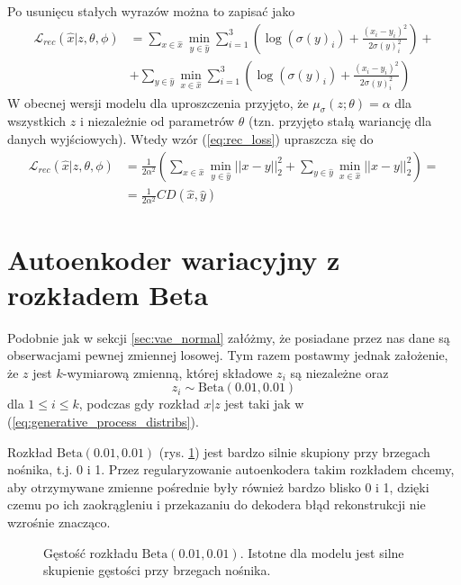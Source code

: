 \documentclass{iithesis}
\begin{document}
Po usunięcu stałych wyrazów można to zapisać jako
\begin{equation} \label{eq:rec_loss}
\begin{split}
\mathcal{L}_{rec}(\hat{x}|z,\theta,\phi) &= \sum_{x \in \hat{x}} \min_{y \in \hat{y}} \sum_{i=1}^3
\left( \log(\sigma(y)_i) + \frac{(x_i-y_i)^2}{2\sigma(y)_i^2} \right) +\\
&+ \sum_{y \in \hat{y}} \min_{x \in \hat{x}} \sum_{i=1}^3
\left( \log(\sigma(y)_i) + \frac{(x_i-y_i)^2}{2\sigma(y)_i^2} \right)
\end{split}
\end{equation}
W obecnej wersji modelu dla uproszczenia przyjęto, że $\mu_\sigma(z;\theta) = \alpha$
dla wszystkich $z$ i niezależnie od parametrów $\theta$ (tzn. przyjęto stałą wariancję dla
danych wyjściowych). Wtedy wzór (\ref{eq:rec_loss}) upraszcza się do
\begin{equation} \label{eq:final_rec_loss}
\begin{split}
\mathcal{L}_{rec}(\hat{x}|z,\theta,\phi) &= \frac{1}{2\alpha^2} \left(
\sum_{x \in \hat{x}} \min_{y \in \hat{y}} ||x-y||_2^2 +
\sum_{y \in \hat{y}} \min_{x \in \hat{x}} ||x-y||_2^2 \right) = \\
&= \frac{1}{2\alpha^2} CD(\hat{x}, \hat{y})
\end{split}
\end{equation}

\section{Autoenkoder wariacyjny z rozkładem Beta} \label{sec:vae_beta}
Podobnie jak w sekcji \ref{sec:vae_normal} załóżmy, że posiadane przez nas dane
są obserwacjami pewnej zmiennej losowej. Tym razem postawmy jednak założenie, że
$z$ jest $k$-wymiarową zmienną, której składowe $z_i$ są niezależne oraz
$$
z_i \sim \text{Beta}(0.01, 0.01)
$$
dla $1 \leq i \leq k$, podczas gdy rozkład $x|z$ jest taki jak w (\ref{eq:generative_process_distribs}).

Rozkład $\text{Beta}(0.01, 0.01)$ (rys. \ref{fig:beta_distrib}) jest bardzo silnie
skupiony przy brzegach nośnika, t.j. 0 i 1. Przez regularyzowanie autoenkodera takim rozkładem
chcemy, aby otrzymywane zmienne pośrednie były również bardzo blisko 0 i 1, dzięki czemu
po ich zaokrągleniu i przekazaniu do dekodera błąd rekonstrukcji nie wzrośnie znacząco.

\begin{figure}
    \caption{\label{fig:beta_distrib} Gęstość rozkładu $\text{Beta}(0.01, 0.01)$.
    Istotne dla modelu jest silne skupienie gęstości przy brzegach nośnika.}
\end{figure}
\end{document}

